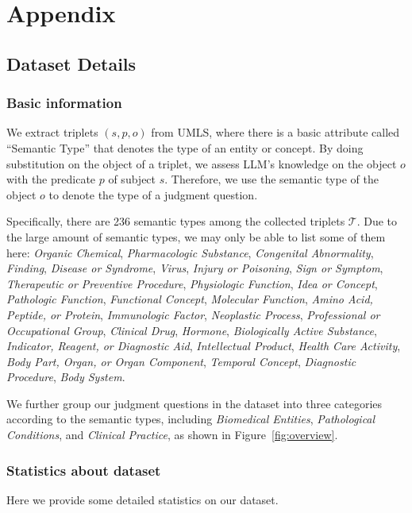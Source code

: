 \section{Appendix}
\label{sec:appendix}


\subsection{Dataset Details}
\label{app:data_detail}

\subsubsection{Basic information}
We extract triplets $(s, p, o)$ from UMLS, where there is a basic attribute called ``Semantic Type'' that denotes the type of an entity or concept. By doing substitution on the object of a triplet, we assess LLM's knowledge on the object $o$ with the predicate $p$ of subject $s$. Therefore, we use the semantic type of the object $o$ to denote the type of a judgment question. 

Specifically, there are 236 semantic types among the collected triplets $\mathcal{T}$. Due to the large amount of semantic types, we may only be able to list some of them here:
\textit{Organic Chemical}, 
\textit{Pharmacologic Substance}, 
\textit{Congenital Abnormality}, 
\textit{Finding}, 
\textit{Disease or Syndrome}, 
\textit{Virus}, 
\textit{Injury or Poisoning}, 
\textit{Sign or Symptom}, 
\textit{Therapeutic or Preventive Procedure}, 
\textit{Physiologic Function}, 
\textit{Idea or Concept}, 
\textit{Pathologic Function}, 
\textit{Functional Concept}, 
\textit{Molecular Function}, 
\textit{Amino Acid, Peptide, or Protein}, 
\textit{Immunologic Factor}, 
\textit{Neoplastic Process}, 
\textit{Professional or Occupational Group}, 
\textit{Clinical Drug}, 
\textit{Hormone}, 
\textit{Biologically Active Substance}, 
\textit{Indicator, Reagent, or Diagnostic Aid}, 
\textit{Intellectual Product}, 
\textit{Health Care Activity}, 
\textit{Body Part, Organ, or Organ Component}, 
\textit{Temporal Concept}, 
\textit{Diagnostic Procedure}, 
\textit{Body System}.


We further group our judgment questions in the \mkj dataset into three categories according to the semantic types, including \textit{Biomedical Entities}, \textit{Pathological Conditions}, and \textit{Clinical Practice}, as shown in Figure~\ref{fig:overview}.


\subsubsection{Statistics about \mkj dataset}
Here we provide some detailed statistics on our \mkj dataset. 

